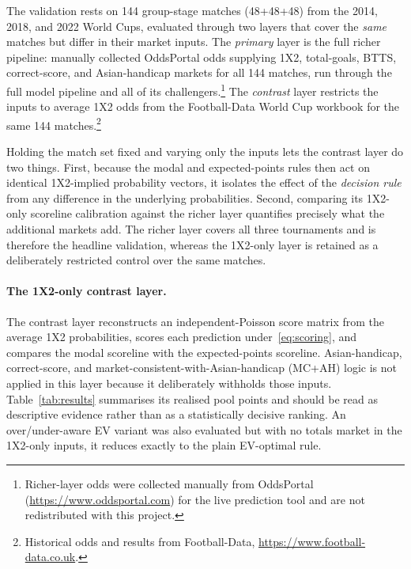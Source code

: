 \documentclass[11pt]{article}
\begin{document}
The validation rests on 144 group-stage matches (48+48+48) from the 2014, 2018, and 2022 World Cups, evaluated through two layers that cover the
\emph{same} matches but differ in their market inputs. The \emph{primary} layer is the full
richer pipeline: manually collected OddsPortal odds supplying 1X2, total-goals, BTTS,
correct-score, and Asian-handicap markets for all 144 matches, run through the full model
pipeline and all of its challengers.\footnote{Richer-layer odds were collected manually from OddsPortal
(\url{https://www.oddsportal.com}) for the live prediction tool and are not redistributed with
this project.} The \emph{contrast} layer restricts the inputs to average 1X2 odds from the
Football-Data World Cup workbook for the same 144 matches.\footnote{Historical odds and results
from Football-Data, \url{https://www.football-data.co.uk}.}

Holding the match set fixed and varying only the inputs lets the contrast layer do two things.
First, because the modal and expected-points rules then act on identical 1X2-implied
probability vectors, it isolates the effect of the \emph{decision rule} from any difference in
the underlying probabilities. Second, comparing its 1X2-only scoreline calibration against the
richer layer quantifies precisely what the additional markets add. The richer layer covers all
three tournaments and is therefore the headline validation, whereas the 1X2-only layer is retained as a deliberately restricted control over the same matches.

\paragraph{The 1X2-only contrast layer.} The contrast layer reconstructs an independent-Poisson score
matrix from the average 1X2 probabilities, scores each prediction under~\eqref{eq:scoring}, and
compares the modal scoreline with the expected-points scoreline. Asian-handicap, correct-score,
and market-consistent-with-Asian-handicap (MC+AH) logic is not applied in this layer because it
deliberately withholds those inputs. Table~\ref{tab:results} summarises its realised pool points
and should be read as descriptive evidence rather than as a statistically decisive ranking. An
over/under-aware EV variant was also evaluated but with no totals market in the 1X2-only inputs, it
reduces exactly to the plain EV-optimal rule.
\end{document}
